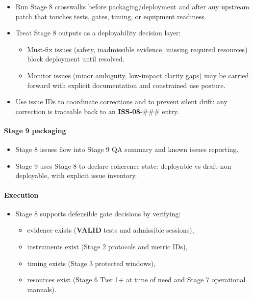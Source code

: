 \documentclass[10pt]{article}
\begin{document}
\begin{itemize}
\item Run Stage 8 crosswalks before packaging/deployment and after any upstream patch that touches tests, gates, timing, or equipment readiness.
\item Treat Stage 8 outputs as a deployability decision layer:
  \begin{itemize}
  \item Must-fix issues (safety, inadmissible evidence, missing required resources) block deployment until resolved.
  \item Monitor issues (minor ambiguity, low-impact clarity gaps) may be carried forward with explicit documentation and constrained use posture.
  \end{itemize}
\item Use issue IDs to coordinate corrections and to prevent silent drift: any correction is traceable back to an \textbf{ISS-08}-\#\#\# entry.
\end{itemize}

\paragraph*{Stage 9 packaging}

\begin{itemize}
\item Stage 8 issues flow into Stage 9 QA summary and known issues reporting.
\item Stage 9 uses Stage 8 to declare coherence state: deployable vs draft-non-deployable, with explicit issue inventory.
\end{itemize}

\paragraph*{Execution}

\begin{itemize}
\item Stage 8 supports defensible gate decisions by verifying:
  \begin{itemize}
  \item evidence exists (\textbf{VALID} tests and admissible sessions),
  \item instruments exist (Stage 2 protocols and metric IDs),
  \item timing exists (Stage 3 protected windows),
  \item resources exist (Stage 6 Tier 1+ at time of need and Stage 7 operational manuals).
  \end{itemize}
\end{itemize}
\end{document}
